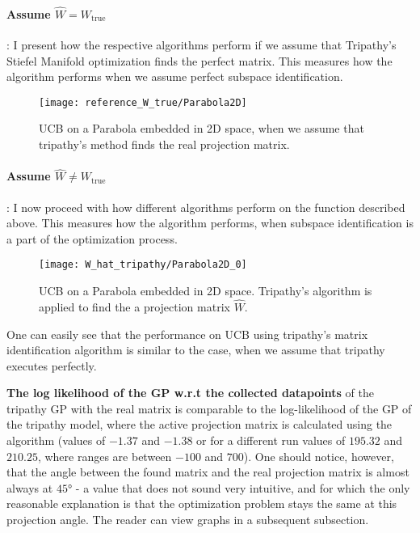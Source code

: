 \paragraph{Assume $\hat{W} = W_{\text{true}}$}: I present how the respective algorithms perform if we assume that Tripathy's Stiefel Manifold optimization finds the perfect matrix.
This measures how the algorithm performs when we assume perfect subspace identification.

\begin{figure}[H]
  \centering
      \texttt{[image: reference\_W\_true/Parabola2D]}
  \caption{UCB on a Parabola embedded in 2D space, when we assume that tripathy's method finds the real projection matrix.}
\end{figure}

\paragraph{Assume $\hat{W} \neq W_{\text{true}}$}: I now proceed with how different algorithms perform on the function described above.
This measures how the algorithm performs, when subspace identification is a part of the optimization process.

\begin{figure}[H]
  \centering
      \texttt{[image: W\_hat\_tripathy/Parabola2D\_0]}
  \caption{UCB on a Parabola embedded in 2D space.
  Tripathy's algorithm is applied to find the a projection matrix $\hat{W}$.}
\end{figure}

One can easily see that the performance on UCB using tripathy's matrix identification algorithm is similar to the case, when we assume that tripathy executes perfectly.



\textbf{The log likelihood of the GP w.r.t the collected datapoints} of the tripathy GP with the real matrix is comparable to the log-likelihood of the GP of the tripathy model, where the active projection matrix is calculated using the algorithm (values of $-1.37$ and $-1.38$ or for a different run values of $195.32$ and $210.25$, where ranges are between  $-100$ and $700$).
One should notice, however, that the angle between the found matrix and the real projection matrix is almost always at $45°$ - a value that does not sound very intuitive, and for which the only reasonable explanation is that the optimization problem stays the same at this projection angle.
The reader can view graphs in a subsequent subsection.


